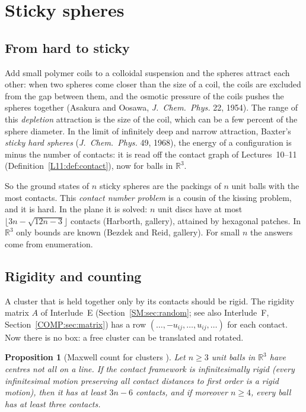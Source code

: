 \documentclass[11pt,openany]{book}
\theoremstyle{plain}
\newtheorem{proposition}[theorem]{Proposition}
\theoremstyle{definition}
\theoremstyle{remark}
\newcommand{\R}{\mathbb{R}}
\begin{document}
\section{Sticky spheres}
\label{PHYS:sec:sticky}

\subsection*{From hard to sticky}
Add small polymer coils to a colloidal suspension and the spheres attract each other: when two spheres
come closer than the size of a coil, the coils are excluded from the gap between them, and the osmotic
pressure of the coils pushes the spheres together (Asakura and Oosawa, \emph{J.\ Chem.\ Phys.} 22, 1954).
The range of this \emph{depletion} attraction is the size of the coil, which can be a few percent of the
sphere diameter. In the limit of infinitely deep and narrow attraction, Baxter's \emph{sticky hard spheres}
(\emph{J.\ Chem.\ Phys.} 49, 1968), the energy of a configuration is minus the number of contacts: it is
read off the contact graph of Lectures~10--11 (Definition~\ref{L11:def:contact}), now for balls in $\R^3$.

So the ground states of $n$ sticky spheres are the packings of $n$ unit balls with the most contacts.
This \emph{contact number problem} is a cousin of the kissing problem, and it is hard. In the plane it is
solved: $n$ unit discs have at most $\lfloor3n-\sqrt{12n-3}\rfloor$ contacts (Harborth, gallery), attained by
hexagonal patches. In $\R^3$ only bounds are known (Bezdek and Reid, gallery). For small $n$ the answers
come from enumeration.

\subsection*{Rigidity and counting}
A cluster that is held together only by its contacts should be rigid. The rigidity matrix $A$ of
Interlude~E (Section~\ref{SM:sec:random}; see also Interlude~F, Section~\ref{COMP:sec:matrix}) has a row
$(\dots,-u_{ij},\dots,u_{ij},\dots)$ for each contact. Now there is no box: a free cluster can be
translated and rotated.

\begin{proposition}[Maxwell count for clusters ]\label{PHYS:prop:cluster}
Let $n\ge3$ unit balls in $\R^3$ have centres not all on a line. If the contact framework is
infinitesimally rigid (every infinitesimal motion preserving all contact distances to first order is a
rigid motion), then it has at least $3n-6$ contacts, and if moreover $n\ge4$, every ball has at least
three contacts.
\end{proposition}
\end{document}
